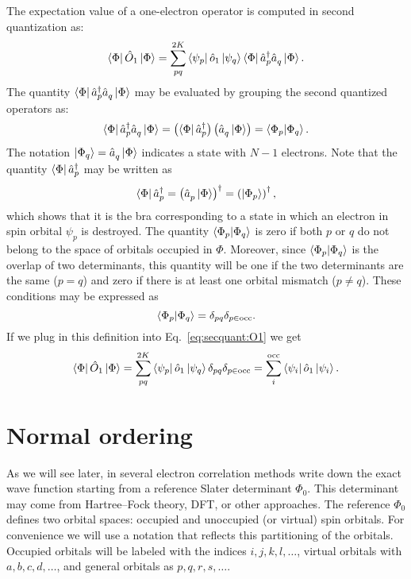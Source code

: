 \documentclass[../Main/chem532-notes.tex]{subfiles}
\begin{document}
The expectation value of a one-electron operator is computed in second quantization as:
\begin{equation}
\bra{\Phi} \hat{O}_1 \ket{\Phi} =
\sum_{pq}^{2K} \bra{\psi_p} \hat{o}_1 \ket{\psi_q} \bra{\Phi} \hat{a}_{p}^{\dagger} \hat{a}_{q}^{\,} \ket{\Phi}.\label{eq:secquant:O1}
\end{equation}
The quantity $\bra{\Phi} \hat{a}_{p}^{\dagger} \hat{a}_{q}^{\,} \ket{\Phi}$ may be evaluated by grouping the second quantized operators as:
\begin{equation}
\bra{\Phi} \hat{a}_{p}^{\dagger} \hat{a}_{q}^{\,} \ket{\Phi} = \left(\bra{\Phi} \hat{a}_{p}^{\dagger}\right) \left( \hat{a}_{q}^{\,} \ket{\Phi} \right) = \braket{\Phi_p|\Phi_q}.
\end{equation}
The notation $\ket{\Phi_q} = \hat{a}_{q}^{\,} \ket{\Phi}$ indicates a state with $N-1$ electrons.
Note that the quantity $\bra{\Phi} \hat{a}_{p}^{\dagger}$ may be written as
\begin{equation}
\bra{\Phi} \hat{a}_{p}^{\dagger} = \left(\hat{a}_{p}^{\,} \ket{\Phi}\right)^\dagger = \left(\ket{\Phi_p}\right)^\dagger,
\end{equation}
which shows that it is the bra corresponding to a state in which an electron in spin orbital $\psi_p$ is destroyed.
The quantity $\braket{\Phi_p | \Phi_q}$ is zero if both $p$ or $q$ do not belong to the space of orbitals occupied in $\Phi$. Moreover, since $\braket{\Phi_p | \Phi_q}$ is the overlap of two determinants, this quantity will be one if the two determinants are the same ($p = q$) and zero if there is at least one orbital mismatch ($p \neq q$).
These conditions may be expressed as
\begin{equation}
\braket{\Phi_p|\Phi_q} = \delta_{pq} \delta_{p \in \mathrm{occ}}.
\end{equation}
If we plug in this definition into Eq.~\eqref{eq:secquant:O1} we get
\begin{equation}
\bra{\Phi} \hat{O}_1 \ket{\Phi} =
\sum_{pq}^{2K} \bra{\psi_p} \hat{o}_1 \ket{\psi_q} \delta_{pq} \delta_{p \in \mathrm{occ}}
= \sum_{i}^\mathrm{occ} \bra{\psi_i} \hat{o}_1 \ket{\psi_i}.
\end{equation}


\section{Normal ordering}
As we will see later, in several electron correlation methods write down the exact wave function starting from a reference Slater determinant $\Phi_0$.
This determinant may come from Hartree--Fock theory, DFT, or other approaches.
The reference $\Phi_0$ defines two orbital spaces: occupied and unoccupied (or virtual) spin orbitals.
For convenience we will use a notation that reflects this partitioning of the orbitals.
Occupied orbitals will be labeled with the indices $i,j,k,l,\ldots$, virtual orbitals with $a,b,c,d,\ldots$, and general orbitals as $p,q,r,s,\ldots$.
\end{document}
